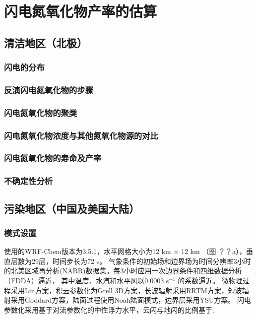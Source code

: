 
\chapter{闪电氮氧化物产率的估算} \label{chapter:PE}

\section{清洁地区（北极）}

\subsection{闪电的分布}
\subsection{反演闪电氮氧化物的步骤}
\subsection{闪电氮氧化物的聚类}
\subsection{闪电氮氧化物浓度与其他氮氧化物源的对比}
\subsection{闪电氮氧化物的寿命及产率}
\subsection{不确定性分析}


\section{污染地区（中国及美国大陆）}

\subsection{模式设置}

使用的WRF-Chem版本为3.5.1，水平网格大小为12 km $\times$ 12 km （图 ？？a），垂直层数为29层，时间步长为72 s。
气象条件的初始场和边界场为时间分辨率3小时的北美区域再分析(NARR)数据集，每3小时应用一次边界条件和四维数据分析（FDDA）逼近，
其中温度、水汽和水平风以0.0003 s$^{-1}$ 的系数逼近\citep{Laughner.2017}。
微物理过程采用Lin方案\citep{Lin.1983}，积云参数化为Grell 3D方案\citep{Grell.1993a,Grell.2002a}，长波辐射采用RRTM方案\citep{Iacono.2008}，短波辐射采用Goddard方案，陆面过程使用Noah陆面模式\citep{Koren.1999}，边界层采用YSU方案\citep{Hong.2006}。
闪电参数化采用基于对流参数化的中性浮力水平\citep{Pickering.1992}，云闪与地闪的比例基于\citet{Boccippio.2001}.

